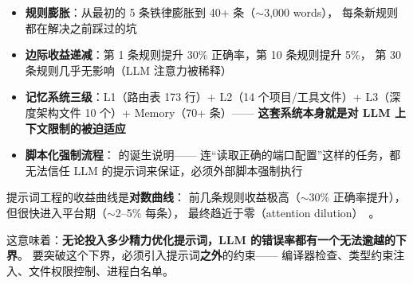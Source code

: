 \documentclass[10pt, openany]{book}
\begin{document}
\begin{itemize}
    \item \textbf{规则膨胀}：从最初的 5 条铁律膨胀到 40+ 条（\(\sim\)3,000 words），
        每条新规则都在解决之前踩过的坑
    \item \textbf{边际收益递减}：第 1 条规则提升 30\% 正确率，第 10 条规则提升 5\%，
        第 30 条规则几乎无影响（LLM 注意力被稀释）~\cite{Liu2023LostInMiddle}
    \item \textbf{记忆系统三级}：L1（路由表 173 行）+ L2（14 个项目/工具文件）+
        L3（深度架构文件 10 个）+ Memory（70+ 条）——
        \textbf{这套系统本身就是对 LLM 上下文限制的被迫适应}
    \item \textbf{脚本化强制流程}： 的诞生说明——
        连``读取正确的端口配置''这样的任务，都无法信任 LLM 的提示词来保证，必须外部脚本强制执行
\end{itemize}

\begin{principle}[提示词天花板]
提示词工程的收益曲线是\textbf{对数曲线}：
前几条规则收益极高（\(\sim\)30\% 正确率提升），
但很快进入平台期（\(\sim\)2--5\% 每条），
最终趋近于零（attention dilution）~\cite{Liu2023LostInMiddle,Wei2022ChainOfThought}。

这意味着：\textbf{无论投入多少精力优化提示词，LLM 的错误率都有一个无法逾越的下界}。
要突破这个下界，必须引入提示词\textbf{之外}的约束——
编译器检查、类型约束注入、文件权限控制、进程白名单。
\end{principle}
\end{document}
